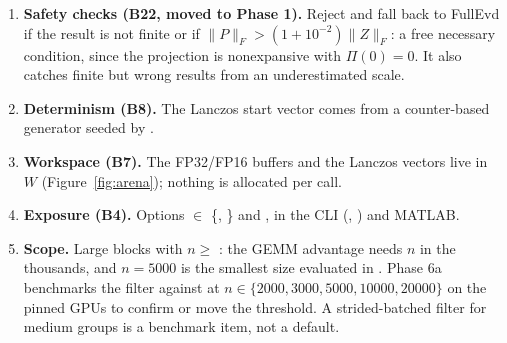 \documentclass[11pt]{article}
\newcommand{\Proj}{\Pi}
\newcommand{\norm}[1]{\lVert #1\rVert}
\begin{document}
\begin{enumerate}
  $\eta\ge10^{-2}$, where an error of about $10^{-3}$ does not limit progress; on H100/H200 (SXM) plain FP32 GEMMs peak at
  the FP64 Tensor Core rate (about 67 TFLOPS, against about 990 for dense FP16); and the FP32-emulated variant needs
  Blackwell GPUs that are not available for validation. A TF32 variant can be added later as a new option value.
  \item \textbf{Safety checks (B22, moved to Phase 1).} Reject and fall back to FullEvd if the result is not
  finite or if $\norm{P}_F > (1+10^{-2})\norm{Z}_F$: a free necessary condition, since the projection is
  nonexpansive with $\Proj(0)=0$. It also catches finite but wrong results from an underestimated scale.
  \item \textbf{Determinism (B8).} The Lanczos start vector comes from a counter-based generator seeded by
  .
  \item \textbf{Workspace (B7).} The FP32/FP16 buffers and the Lanczos vectors live in $W$
  (Figure~\ref{fig:arena}); nothing is allocated per call.
  \item \textbf{Exposure (B4).} Options  $\in$ \{, \} and
  , in the CLI (, ) and MATLAB.
  \item \textbf{Scope.} Large blocks with $n\ge$ : the GEMM advantage needs $n$ in the thousands,
  and $n = 5000$ is the smallest size evaluated in \cite{composite}. Phase 6a benchmarks the filter against
   at $n\in\{2000, 3000, 5000, 10000, 20000\}$ on the pinned GPUs to confirm or move the
  threshold. A strided-batched filter for medium groups is a benchmark item, not a default.
\end{enumerate}
\end{document}
